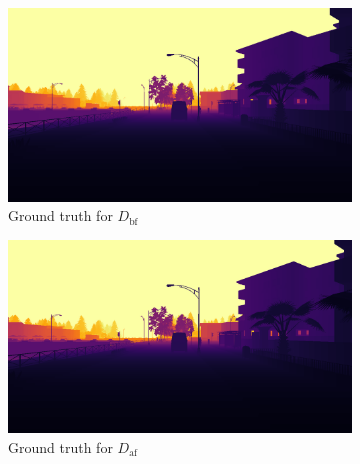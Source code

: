 \begin{figure}
  \centering
  \begin{subfigure}{0.475\linewidth}
    \centering
    \includegraphics[width=\textwidth]{mainmatter/figures/4_depth_conv/depth_diff_example/gtprev000015.png}
    \caption{Ground truth for \(D_\text{bf}\)}
  \end{subfigure}
  \begin{subfigure}{0.475\linewidth}
    \centering
    \includegraphics[width=\textwidth]{mainmatter/figures/4_depth_conv/depth_diff_example/gtcurr000015.png}
    \caption{Ground truth for \(D_\text{af}\)}
  \end{subfigure}
  \begin{subfigure}{\linewidth}
    \centering

\end{subfigure}
\end{figure}
